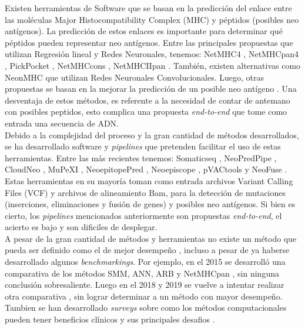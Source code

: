 Existen herramientas de Software que se basan en la predicción del enlace entre las moléculas Major Histocompatibility Complex (MHC) y péptidos (posibles neo antígenos). La predicción de estos enlaces es importante para determinar qué péptidos pueden representar neo antígenos. Entre las principales propuestas que utilizan Regresión lineal y Redes Neuronales, tenemos: NetMHC4 \citep{stevanovic2017landscape}, NetMHCpan4 \citep{robbins2013mining}, PickPocket \citep{tran2014cancer}, NetMHCcons \citep{castle2012exploiting}, NetMHCIIpan \citep{yadav2014predicting}. También, existen alternativas como NeonMHC \citep{van2013tumor} que utilizan Redes Neuronales Convolucionales. Luego, otras propuestas se basan en la mejorar la predicción de un posible neo antígeno \citep{lu2021deep, hao2021improvement, lang2021neofox, chen2021identification, yang2021deepnetbim, li2021deepimmuno}.  Una desventaja de estos métodos, es referente a la necesidad de contar de antemano con posibles peptidos, esto complica una propuesta \textit{end-to-end} que tome como entrada una secuencia de ADN.\\

Debido a la complejidad del proceso y la gran cantidad de métodos desarrollados, se ha desarrollado software y \textit{pipelines} que pretenden facilitar el uso de estas herramientas. Entre las más recientes tenemos: Somaticseq \citep{fang2015ensemble}, NeoPredPipe \citep{schenck2019neopredpipe}, CloudNeo \citep{bais2017cloudneo}, MuPeXI \citep{bjerregaard2017mupexi}, NeoepitopePred \citep{tran2015immunogenicity}, Neoepiscope \citep{yossef2018enhanced}, pVACtools \citep{hundal2020pvactools}  y NeoFuse \citep{gros2016prospective}. Estas herramientas en su mayoría toman como entrada archivos Variant Calling Files (VCF) y archivos de alineamiento Bam, para la detección de mutaciones (inserciones, eliminaciones y fusión de genes) y posibles neo antígenos. Si bien es cierto, los \textit{pipelines} mencionados anteriormente son propuestas \textit{end-to-end}, el acierto es bajo y son dificiles de desplegar.\\

A pesar de la gran cantidad de métodos y herramientas no existe un método que pueda ser definido como el de mejor desempeño \citep{de2020neoantigen}, incluso a pesar de ya haberse desarrollado algunos \textit{benchmarkings}. Por ejemplo, en el 2015 se desarrolló una comparativa de los métodos SMM, ANN, ARB y NetMHCpan \citep{trolle2015automated}, sin ninguna conclusión sobresaliente. Luego en el 2018 y 2019 se vuelve a intentar realizar otra comparativa \citep{bonsack2019performance, zhao2018systematically}, sin lograr determinar a un método con mayor desempeño. Tambien se han desarrollado \textit{surveys} sobre como los métodos computacionales pueden tener beneficios clínicos \citep{de2020neoantigen} y sus principales desafios \citep{chen2021challenges}. \\


